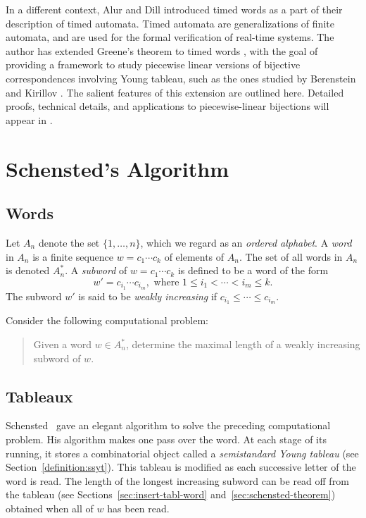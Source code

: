 \documentclass[10pt]{amsproc}
\theoremstyle{definition}
\theoremstyle{remark}
\begin{document}
In a different context, Alur and Dill \cite{alur-dill} introduced timed words as a part of their description of timed automata.
Timed automata are generalizations of finite automata, and are used for the formal verification of real-time systems.
The author has extended Greene's theorem to timed words \cite{timed-plactic}, with the goal of providing a framework to study piecewise linear versions of bijective correspondences involving Young tableau, such as the ones studied by Berenstein and Kirillov \cite{kir-trop}.
The salient features of this extension are outlined here.
Detailed proofs, technical details, and applications to piecewise-linear bijections will appear in \cite{timed-plactic}.
\section{Schensted's Algorithm}
\label{sec:intro}
\subsection{Words}
\label{sec:words}
Let $A_n$ denote the set $\{1,\dotsc,n\}$, which we regard as an \emph{ordered alphabet}.
A \emph{word} in $A_n$ is a finite sequence $w=c_1\dotsb c_k$ of elements of $A_n$.
The set of all words in $A_n$ is denoted $A_n^*$.
A \emph{subword} of $w=c_1\dotsb c_k$ is defined to be a word of the form
\begin{displaymath}
  w' = c_{i_1}\dotsb c_{i_m}, \text{ where } 1\leq i_1 < \dotsb < i_m \leq k.
\end{displaymath}
The subword $w'$ is said to be \emph{weakly increasing} if $c_{i_1}\leq \dotsb \leq c_{i_m}$.

Consider the following computational problem:
\begin{quote}
  Given a word $w\in A_n^*$, determine the maximal length of a weakly increasing subword of $w$.
\end{quote}
\subsection{Tableaux}
Schensted~\cite{schensted} gave an elegant algorithm to solve the preceding computational problem.
His algorithm makes one pass over the word.
At each stage of its running, it stores a combinatorial object called a \emph{semistandard Young tableau} (see Section~\ref{definition:ssyt}).
This tableau is modified as each successive letter of the word is read.
The length of the longest increasing subword can be read off from the tableau (see Sections~\ref{sec:insert-tabl-word} and~\ref{sec:schensted-theorem}) obtained when all of $w$ has been read.
\end{document}
